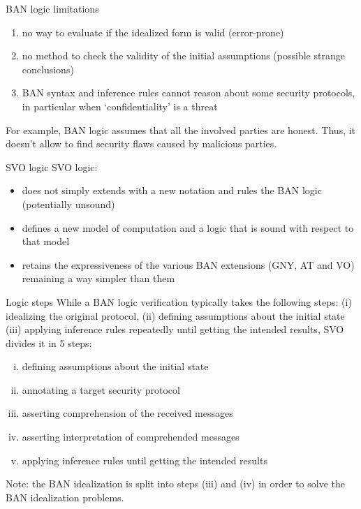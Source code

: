 \documentclass[10pt]{beamer}
\begin{document}
\begin{frame}{BAN logic limitations}
	\begin{enumerate}
		\item no way to evaluate if the idealized form is valid (error-prone)
		\item no method to check the validity of the initial assumptions (possible strange conclusions)
		\item BAN syntax and inference rules cannot reason about some security protocols, in particular when `confidentiality' is a threat
	\end{enumerate}
	\par For example, BAN logic assumes that all the involved parties are honest. Thus, it doesn't allow to find security flaws caused by malicious parties.
\end{frame}
\begin{frame}{SVO logic}
	SVO logic: 
	\begin{itemize}
		\item does not simply extends with a new notation and rules the BAN logic (potentially unsound)
		\item defines a new model of computation and a logic that is sound with respect to that model
		\item retains the expressiveness of the various BAN extensions (GNY, AT and VO) remaining a way simpler than them 
	\end{itemize}
\end{frame}
\begin{frame}{Logic steps}
	While a BAN logic verification typically takes the following steps:  (i) idealizing the original protocol, (ii) defining assumptions about the initial state (iii) applying inference rules repeatedly until getting the intended results, SVO divides it in 5 steps:
	\begin{enumerate}[(i)]
		\item defining assumptions about the initial state
		\item annotating a target security protocol
		\item asserting comprehension of the received messages
		\item asserting interpretation of comprehended messages
		\item applying inference rules until getting the intended results
	\end{enumerate}
	\alert{Note:} the BAN idealization is split into steps (iii) and (iv) in order to solve the BAN idealization problems.
\end{frame}
\end{document}
